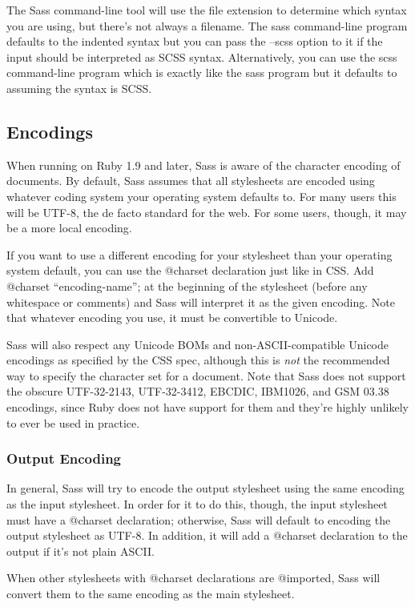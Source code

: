 \documentclass[9pt]{article}
\begin{document}
 The Sass command-line tool will use the file extension to determine which syntax you are using, but there’s not always a filename. The sass command-line program defaults to the indented syntax but you can pass the --scss option to it if the input should be interpreted as SCSS syntax. Alternatively, you can use the scss command-line program which is exactly like the sass program but it defaults to assuming the syntax is SCSS.
\subsection{Encodings}


 When running on Ruby 1.9 and later, Sass is aware of the character encoding of documents. By default, Sass assumes that all stylesheets are encoded using whatever coding system your operating system defaults to. For many users this will be UTF-8, the de facto standard for the web. For some users, though, it may be a more local encoding.


 If you want to use a different encoding for your stylesheet than your operating system default, you can use the @charset declaration just like in CSS. Add @charset ``encoding-name''; at the beginning of the stylesheet (before any whitespace or comments) and Sass will interpret it as the given encoding. Note that whatever encoding you use, it must be convertible to Unicode.


 Sass will also respect any Unicode BOMs and non-ASCII-compatible Unicode encodings as specified by the CSS spec, although this is \emph{not}
 the recommended way to specify the character set for a document. Note that Sass does not support the obscure UTF-32-2143, UTF-32-3412, EBCDIC, IBM1026, and GSM 03.38 encodings, since Ruby does not have support for them and they’re highly unlikely to ever be used in practice.
\subsubsection{Output Encoding}


 In general, Sass will try to encode the output stylesheet using the same encoding as the input stylesheet. In order for it to do this, though, the input stylesheet must have a @charset declaration; otherwise, Sass will default to encoding the output stylesheet as UTF-8. In addition, it will add a @charset declaration to the output if it’s not plain ASCII.


 When other stylesheets with @charset declarations are @imported, Sass will convert them to the same encoding as the main stylesheet.
\end{document}
